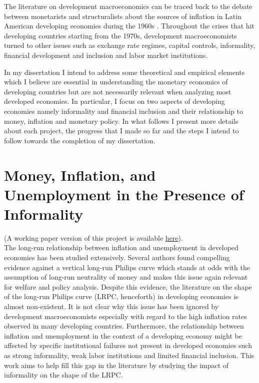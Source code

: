 \documentclass[12pt,a4paper,titlepage]{article}
\begin{document}
The literature on development macroeconomics can be traced back to the debate between monetarists and structuralists about the sources of inflation in Latin American developing economies during the 1960s \citep{Agenor2008}. Throughout the crises that hit developing countries starting from the 1970s, development macroeconomists turned to other issues such as exchange rate regimes, capital controls, informality, financial development and inclusion and labor market institutions.

In my dissertation I intend to address some theoretical and empirical elements which I believe are essential in understanding the monetary economics of developing countries but are not necessarily relevant when analyzing most developed economies. In particular, I focus on two aspects of developing economies namely informality and financial inclusion and their relationship to money, inflation and monetary policy. In what follows I present more details about each project, the progress that I made so far and the steps I intend to follow towards the completion of my dissertation.


\section{Money, Inflation, and Unemployment in the Presence of Informality}

(A working paper version of this project is available \href{http://www.econ.uzh.ch/static/workingpapers.php?id=927}{here}).
\\

The long-run relationship between inflation and unemployment in developed economies has been studied extensively. Several authors found compelling evidence against a vertical long-run Philips curve \citep{Karanassou2003, Beyer2007, Schreiber2007, Berentsen2011} which stands at odds with the assumption of long-run neutrality of money and makes this issue again relevant for welfare and policy analysis. Despite this evidence, the literature on the shape of the long-run Philips curve (LRPC, henceforth) in developing economies is almost non-existent. It is not clear why this issue has been ignored by development macroeconomists especially with regard to the high inflation rates observed in many developing countries. Furthermore, the relationship between inflation and unemployment in the context of a developing economy might be affected by specific institutional failures not present in developed economies such as strong informality, weak labor institutions and limited financial inclusion. This work aims to help fill this gap in the literature by studying the impact of informality on the shape of the LRPC.
\end{document}
